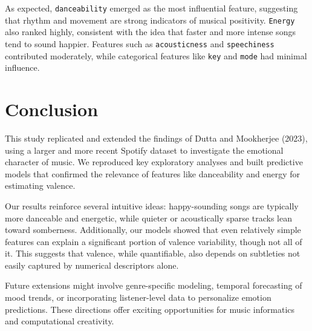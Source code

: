 \documentclass[a4paper,11pt]{article}
\begin{document}
As expected, \texttt{danceability} emerged as the most influential feature, suggesting that rhythm and movement are strong indicators of musical positivity. \texttt{Energy} also ranked highly, consistent with the idea that faster and more intense songs tend to sound happier. Features such as \texttt{acousticness} and \texttt{speechiness} contributed moderately, while categorical features like \texttt{key} and \texttt{mode} had minimal influence.

\section{Conclusion}
This study replicated and extended the findings of Dutta and Mookherjee (2023), using a larger and more recent Spotify dataset to investigate the emotional character of music. We reproduced key exploratory analyses and built predictive models that confirmed the relevance of features like danceability and energy for estimating valence.

Our results reinforce several intuitive ideas: happy-sounding songs are typically more danceable and energetic, while quieter or acoustically sparse tracks lean toward somberness. Additionally, our models showed that even relatively simple features can explain a significant portion of valence variability, though not all of it. This suggests that valence, while quantifiable, also depends on subtleties not easily captured by numerical descriptors alone.

Future extensions might involve genre-specific modeling, temporal forecasting of mood trends, or incorporating listener-level data to personalize emotion predictions. These directions offer exciting opportunities for music informatics and computational creativity.


\end{document}
